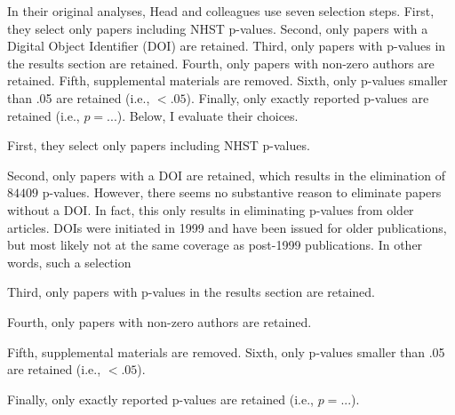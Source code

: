 In their original analyses, Head and colleagues use seven selection steps. First, they select only papers including NHST p-values. Second, only papers with a Digital Object Identifier (DOI) are retained. Third, only papers with p-values in the results section are retained. Fourth, only papers with non-zero authors are retained. Fifth, supplemental materials are removed. Sixth, only p-values smaller than .05 are retained (i.e., $<.05$). Finally, only exactly reported p-values are retained (i.e., $p=...$). Below, I evaluate their choices.

First, they select only papers including NHST p-values. 

Second, only papers with a DOI are retained, which results in the elimination of $84409$ p-values. However, there seems no substantive reason to eliminate papers without a DOI. In fact, this only results in eliminating p-values from older articles. DOIs were initiated in 1999 \cite{crossref2009} and have been issued for older publications, but most likely not at the same coverage as post-1999 publications. In other words, such a selection 

Third, only papers with p-values in the results section are retained. 

Fourth, only papers with non-zero authors are retained. 

Fifth, supplemental materials are removed. Sixth, only p-values smaller than .05 are retained (i.e., $<.05$). 

Finally, only exactly reported p-values are retained (i.e., $p=...$). 